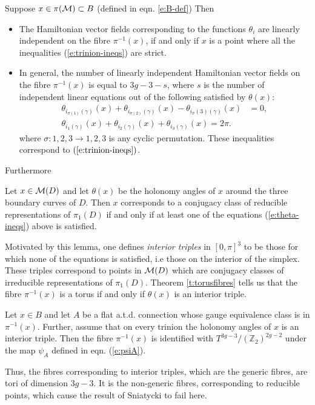 	\begin{theorem}
		\label{t:torusfibres}
		Suppose $x\in \pi(\mathcal{M}) \subset B$ (defined in eqn. \ref{e:B-def}) Then
		\begin{itemize}
			\item The Hamiltonian vector fields corresponding to the functions $\theta_i$ are linearly independent on the fibre $\pi^{-1}(x)$, if and only if $x$ is a point where all the inequalities (\ref{e:trinion-ineqs}) are strict.
			\item In general, the number of linearly independent Hamiltonian vector fields on the fibre $\pi^{-1}(x)$ is equal to $3g-3-s$, where $s$ is the number of independent linear equations out of the following satisfied by $\theta(x)$:
				\begin{align*}
					\theta_{i_{\sigma(1)}(\gamma)}(x) + \theta_{i_{\sigma(2)}(\gamma)}(x)-\theta_{i{_\sigma(3)}(\gamma)}(x)&=0,\\
					\theta_{i_1(\gamma)}(x) + \theta_{i_2(\gamma)}(x) + \theta_{i_3(\gamma)}(x) = 2\pi.
				\end{align*}
			where $\sigma:{1,2,3}\to{1,2,3}$ is any cyclic permutation. These inequalities correspond to $(\ref{e:trinion-ineqs})$.
		\end{itemize}
	\end{theorem}
	Furthermore
	\begin{lemma}
		Let $x\in \mathcal{M}(D)$ and let $\theta(x)$ be the holonomy angles of $x$ around the three boundary curves of $D$. Then $x$ corresponds to a conjugacy class of reducible representations of $\pi_1(D)$ if and only if at least one of the equations (\ref{e:theta-ineqs}) above is satisfied.
	\end{lemma}
	Motivated by this lemma, one defines \emph{interior triples} in $[0,\pi]^3$ to be those for which none of the equations is satisfied, i.e those on the interior of the simplex. These triples correspond to points in $\mathcal{M}(D)$ which are conjugacy classes of irreducible representations of $\pi_1(D)$. Theorem \ref{t:torusfibres} tells us that the fibre $\pi^{-1}(x)$ is a torus if and only if $\theta(x)$ is an interior triple.
	\begin{theorem}
		Let $x\in B$ and let $A$ be a flat a.t.d. connection whose gauge equivalence class is in $\pi^{-1}(x)$. Further, assume that on every trinion the holonomy angles of $x$ is an interior triple. Then the fibre $\pi^{-1}(x)$ is identified with $T^{3g-3}/(\mathbb{Z}_2)^{2g-2}$ under the map $\psi_A$ defined in eqn. (\ref{e:psiA}).
	\end{theorem}
	Thus, the fibres corresponding to interior triples, which are the generic fibres, are tori of dimension $3g-3$. It is the non-generic fibres, corresponding to reducible points, which cause the result of Sniatycki to fail here.

